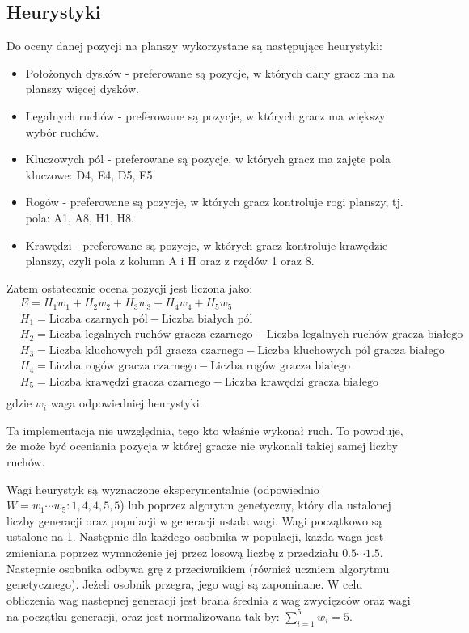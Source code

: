 \documentclass{article}
\begin{document}
\subsection*{Heurystyki}
Do oceny danej pozycji na planszy wykorzystane są następujące heurystyki: \begin{itemize}
    \item Położonych dysków - preferowane są pozycje, w których dany gracz ma na planszy więcej dysków.
    \item Legalnych ruchów - preferowane są pozycje, w których gracz ma większy wybór ruchów.
    \item Kluczowych pól - preferowane są pozycje, w których gracz ma zajęte pola kluczowe: D4, E4, D5, E5.
    \item Rogów - preferowane są pozycje, w których gracz kontroluje rogi planszy, tj. pola: A1, A8, H1, H8.
    \item Krawędzi - preferowane są pozycje, w których gracz kontroluje krawędzie planszy, czyli pola z kolumn A i H oraz z rzędów 1 oraz 8.
\end{itemize}

Zatem ostatecznie ocena pozycji jest liczona jako:
\begin{align*}
    &E = H_1 w_1 + H_2 w_2 + H_3 w_3 + H_4 w_4 + H_5 w_5\\
    &H_1 = \text{Liczba czarnych pól} - \text{Liczba białych pól}\\
    &H_2 = \text{Liczba legalnych ruchów gracza czarnego} - \text{Liczba legalnych ruchów gracza białego}\\
    &H_3 = \text{Liczba kluchowych pól gracza czarnego} - \text{Liczba kluchowych pól gracza białego}\\
    &H_4 = \text{Liczba rogów gracza czarnego} - \text{Liczba rogów gracza białego}\\
    &H_5 = \text{Liczba krawędzi gracza czarnego} - \text{Liczba krawędzi gracza białego}\\
\end{align*}
gdzie $w_i$ waga odpowiedniej heurystyki.

Ta implementacja nie uwzględnia, tego kto właśnie wykonał ruch. To powoduje, że może być oceniania pozycja w której gracze nie wykonali takiej samej liczby ruchów.

Wagi heurystyk są wyznaczone eksperymentalnie (odpowiednio $W =w_1\cdots w_5: 1, 4, 4, 5, 5$) lub poprzez algorytm genetyczny, który dla ustalonej liczby generacji oraz populacji w generacji ustala wagi. Wagi początkowo są ustalone na 1. Następnie dla każdego osobnika w populacji, każda waga jest zmieniana poprzez wymnożenie jej przez losową liczbę z przedziału $0.5\cdots1.5$. Nastepnie osobnika odbywa grę z przeciwnikiem (również uczniem algorytmu genetycznego). Jeżeli osobnik przegra, jego wagi są zapominane. W celu obliczenia wag nastepnej generacji jest brana średnia z wag zwycięzców oraz wagi na początku generacji, oraz jest normalizowana tak by: $\sum^{5}_{i=1}w_i = 5$.
\end{document}
